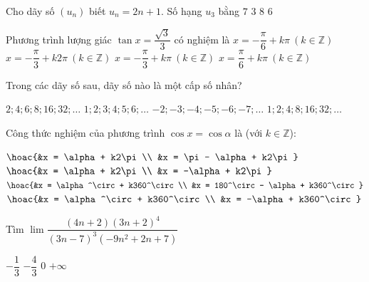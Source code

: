\begin{ex}
Cho dãy số $(u_n)$ biết $u_n = 2n + 1$.  
Số hạng $u_3$ bằng
\choice
{$7$}
{$3$}
{$8$}
{$6$}
\end{ex}
\begin{ex}
Phương trình lượng giác $\tan x = \dfrac{\sqrt{3}}{3}$ có nghiệm là
\choice
{$x = -\dfrac{\pi}{6} + k\pi \ (k \in \mathbb{Z})$}
{$x = -\dfrac{\pi}{3} + k2\pi \ (k \in \mathbb{Z})$}
{$x = -\dfrac{\pi}{3} + k\pi \ (k \in \mathbb{Z})$}
{$x = \dfrac{\pi}{6} + k\pi \ (k \in \mathbb{Z})$}
\end{ex}
\begin{ex}
Trong các dãy số sau, dãy số nào là một cấp số nhân?

\choice
{$2; 4; 6; 8; 16; 32; \ldots$}
{$1; 2; 3; 4; 5; 6; \ldots$}
{$-2; -3; -4; -5; -6; -7; \ldots$}
{$1; 2; 4; 8; 16; 32; \ldots$}
\end{ex}
\begin{ex}
Công thức nghiệm của phương trình $\cos x = \cos \alpha$ là (với $k \in \mathbb{Z}$):

\choice
{$\hoac{&x = \alpha + k2\pi \\ &x = \pi - \alpha + k2\pi}$}
{$\hoac{&x = \alpha + k2\pi \\ &x = -\alpha + k2\pi}$}
{$\hoac{&x = \alpha^\circ + k360^\circ \\ &x = 180^\circ - \alpha + k360^\circ}$}
{$\hoac{&x = \alpha^\circ + k360^\circ \\ &x = -\alpha + k360^\circ}$}
\end{ex}
\begin{ex} 
Tìm $\lim \dfrac{\left(4n+2\right)\left(3n+2 \right)^4  }{ \left(3n-7 \right)^3\left(-9n^2+2n+7 \right)  }$ 

\choice 
{$- \dfrac{1}{3}$}
{\True  $- \dfrac{4}{3}$}
{$0$}
{$+\infty$ }
\end{ex}
